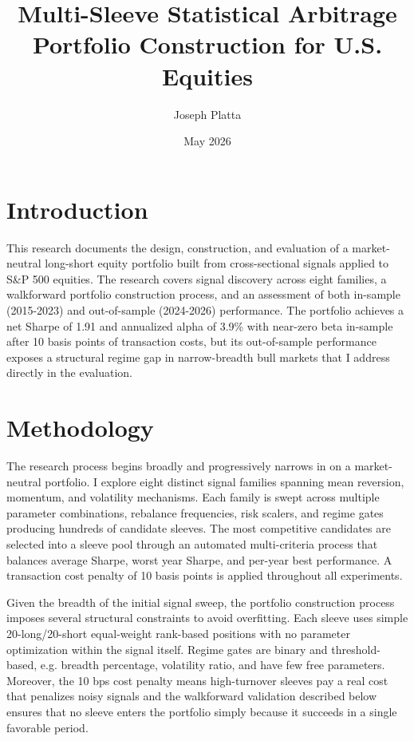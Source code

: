 \documentclass{article}
\title{Multi-Sleeve Statistical Arbitrage Portfolio Construction for U.S. Equities}
\author{Joseph Platta}
\date{May 2026}
\begin{document}
\maketitle

\section{Introduction}

This research documents the design, construction, and evaluation of a market-neutral long-short equity portfolio built from cross-sectional signals applied to S\&P 500 equities. The research covers signal discovery across eight families, a walkforward portfolio construction process, and an assessment of both in-sample (2015-2023) and out-of-sample (2024-2026) performance. The portfolio achieves a net Sharpe of 1.91 and annualized alpha of 3.9\% with near-zero beta in-sample after 10 basis points of transaction costs, but its out-of-sample performance exposes a structural regime gap in narrow-breadth bull markets that I address directly in the evaluation.

\section{Methodology}

The research process begins broadly and progressively narrows in on a market-neutral portfolio. I explore eight distinct signal families spanning mean reversion, momentum, and volatility mechanisms. Each family is swept across multiple parameter combinations, rebalance frequencies, risk scalers, and regime gates producing hundreds of candidate sleeves. The most competitive candidates are selected into a sleeve pool through an automated multi-criteria process that balances average Sharpe, worst year Sharpe, and per-year best performance. A transaction cost penalty of 10 basis points is applied throughout all experiments.

Given the breadth of the initial signal sweep, the portfolio construction process imposes several structural constraints to avoid overfitting. Each sleeve uses simple 20-long/20-short equal-weight rank-based positions with no parameter optimization within the signal itself. Regime gates are binary and threshold-based, e.g. breadth percentage, volatility ratio, and have few free parameters. Moreover, the 10 bps cost penalty means high-turnover sleeves pay a real cost that penalizes noisy signals and the walkforward validation described below ensures that no sleeve enters the portfolio simply because it succeeds in a single favorable period.
\end{document}

